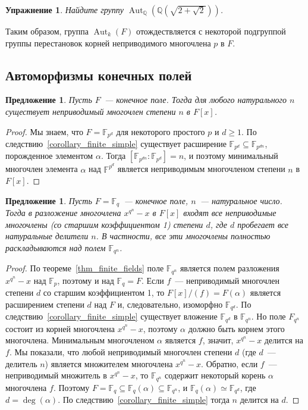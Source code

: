 \documentclass[a4paper,11pt]{scrartcl}
\theoremstyle{plain}
\newtheorem{proposition}[theorem]{Предложение}
\newtheorem{exercise}[theorem]{Упражнение}
\theoremstyle{definition}
\newcommand\mb{\mathbb}
\newcommand\sseq{\subseteq}
\newcommand\Aut{\operatorname{Aut}}
\begin{document}
\begin{exercise}
Найдите группу $\Aut_{\mb Q}(\mb Q(\sqrt{2+\sqrt{2}}))$.
\end{exercise}

Таким образом, группа $\Aut_k(F)$ отождествляется с некоторой
подгруппой группы перестановок корней неприводимого многочлена $p$ в
$F$.

\subsection{Автоморфизмы конечных полей}
\label{ssect:finite-fields-automorphisms}

\begin{proposition}
Пусть $F$~--- конечное поле. Тогда для любого натурального $n$
существует неприводимый многочлен степени $n$ в $F[x]$.
\end{proposition}
\begin{proof}
Мы знаем, что $F=\mb F_{p^d}$ для некоторого простого $p$ и $d\geq
1$. По следствию~\ref{corollary_finite_simple} существует расширение
$\mb F_{p^d}\sseq\mb F_{p^{dn}}$, порожденное элементом $\alpha$.
Тогда
$[\mb F_{p^{dn}}:\mb F_{p^d}]=n$, и поэтому минимальный многочлен
элемента $\alpha$ над $\mb F^{p^d}$ является неприводимым многочленом
степени $n$ в $F[x]$.
\end{proof}

\begin{proposition}
Пусть $F=\mb F_q$~--- конечное поле, $n$~--- натуральное число. Тогда
в разложение многочлена $x^{q^n}-x$ в $F[x]$ входят все неприводимые
многочлены (со старшим коэффициентом 1) степени $d$, где $d$ пробегает
все натуральные делители $n$. В частности, все эти многочлены
полностью раскладываются над полем $\mb F_{q^n}$.
\end{proposition}
\begin{proof}
По теореме~\ref{thm_finite_fields} поле $\mb F_{q^n}$ является полем
разложения $x^{q^n}-x$ над $\mb F_p$, поэтому и над $\mb F_q=F$. Если
$f$~--- неприводимый многочлен степени $d$ со старшим коэффициентом 1,
то $F[x]/(f)=F(\alpha)$ является расширением степени $d$ над $F$ и,
следовательно, изоморфно $\mb F_{q^d}$. По
следствию~\ref{corollary_finite_simple} существует вложение $\mb
F_{q^d}$ в $\mb F_{q^n}$. Но поле $F_{q^n}$ состоит из корней
многочлена $x^{q^n}-x$, поэтому $\alpha$ должно быть корнем этого
многочлена. Минимальным многочленом $\alpha$ является $f$, значит,
$x^{q^n}-x$ делится на $f$. Мы показали, что любой неприводимый
многочлен степени $d$ (где $d$~--- делитель $n$) является множителем
многочлена $x^{q^n}-x$.
Обратно, если $f$~--- неприводимый множитель в $x^{q^n}-x$, то $\mb
F_{q^n}$ содержит некоторый корень $\alpha$ многочлена $f$. Поэтому
$F=\mb F_q\sseq\mb F_q(\alpha)\sseq\mb F_{q^n}$,
и $\mb F_q(\alpha)\simeq\mb
F_{q^d}$, где $d=\deg(\alpha)$.
По следствию~\ref{corollary_finite_simple}
тогда $n$ делится на $d$.
\end{proof}
\end{document}
